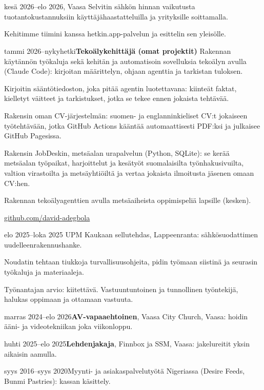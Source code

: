 \documentclass[a4paper,11pt]{article}
\begin{document}
\section{}
\begin{cventry}{kesä 2026--elo 2026}{, Vaasa}
  Selvitin sähkön hinnan vaikutusta tuotantokustannuksiin käyttäjähaastatteluilla ja yrityksille soittamalla.\par
  Kehitimme tiimini kanssa hetkin.app-palvelun ja esittelin sen yleisölle.
\end{cventry}
\begin{cventry}{tammi 2026--nykyhetki}{\textbf{Tekoälykehittäjä (omat projektit)}}
  Rakennan käytännön työkaluja sekä kehitän ja automatisoin sovelluksia tekoälyn avulla (Claude Code): kirjoitan määrittelyn, ohjaan agenttia ja tarkistan tuloksen.\par
  Kirjoitin sääntötiedoston, joka pitää agentin luotettavana: kiinteät faktat, kielletyt väitteet ja tarkistukset, jotka se tekee ennen jokaista tehtävää.\par
  Rakensin oman CV-järjestelmän: suomen- ja englanninkieliset CV:t jokaiseen työtehtävään, jotka GitHub Actions kääntää automaattisesti PDF:ksi ja julkaisee GitHub Pagesissa.\par
  Rakensin JobDeskin, metsäalan urapalvelun (Python, SQLite): se kerää metsäalan työpaikat, harjoittelut ja kesätyöt suomalaisilta työnhakusivuilta, valtion virastoilta ja metsäyhtiöiltä ja vertaa jokaista ilmoitusta jäsenen omaan CV:hen.\par
  Rakennan tekoälyagenttien avulla metsäaiheista oppimispeliä lapsille (kesken).\par
  \faGithub{} \href{https://github.com/david-adegbola}{github.com/david-adegbola}
\end{cventry}
\begin{cventry}{elo 2025--loka 2025}{}
  UPM Kaukaan sellutehdas, Lappeenranta: sähkösuodattimen uudelleenrakennushanke.\par
  Noudatin tehtaan tiukkoja turvallisuusohjeita, pidin työmaan siistinä ja seurasin työkaluja ja materiaaleja.\par
  Työnantajan arvio: kiitettävä. Vastuuntuntoinen ja tunnollinen työntekijä, halukas oppimaan ja ottamaan vastuuta.
\end{cventry}
\begin{cventry}{marras 2024--elo 2026}{\textbf{AV-vapaaehtoinen}, Vaasa City Church, Vaasa: hoidin ääni- ja videotekniikan joka viikonloppu.}
\end{cventry}
\begin{cventry}{huhti 2025--elo 2025}{\textbf{Lehdenjakaja}, Finnbox ja SSM, Vaasa: jakelureitit yksin aikaisin aamulla.}
\end{cventry}
\begin{cventry}{syys 2016--syys 2020}{Myynti- ja asiakaspalvelutyötä Nigeriassa (Desire Feeds, Bunmi Pastries): kassan käsittely.}
\end{cventry}
\end{document}
